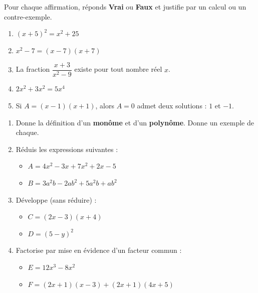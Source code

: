 \documentclass[11pt]{article}
\begin{document}
\begin{exercice}
Pour chaque affirmation, réponds \textbf{Vrai} ou \textbf{Faux} et justifie par un calcul ou un contre-exemple.
\begin{enumerate}
    \item $(x + 5)^2 = x^2 + 25$
    \item $x^2 - 7 = (x - 7)(x + 7)$
    \item La fraction $\dfrac{x + 3}{x^2 - 9}$ existe pour tout nombre réel $x$.
    \item $2x^2 + 3x^2 = 5x^4$
    \item Si $A = (x - 1)(x + 1)$, alors $A = 0$ admet deux solutions : $1$ et $-1$.
\end{enumerate}
\end{exercice}

\begin{exercice}
\begin{enumerate}
    \item Donne la définition d'un \textbf{monôme} et d'un \textbf{polynôme}. Donne un exemple de chaque.
    \item Réduis les expressions suivantes :
    \begin{itemize}
        \item $A = 4x^2 - 3x + 7x^2 + 2x - 5$
        \item $B = 3a^2b - 2ab^2 + 5a^2b + ab^2$
    \end{itemize}
    \item Développe (sans réduire) :
    \begin{itemize}
        \item $C = (2x - 3)(x + 4)$
        \item $D = (5 - y)^2$
    \end{itemize}
    \item Factorise par mise en évidence d'un facteur commun :
    \begin{itemize}
        \item $E = 12x^3 - 8x^2$
        \item $F = (2x + 1)(x - 3) + (2x + 1)(4x + 5)$
    \end{itemize}
\end{enumerate}
\end{exercice}
\end{document}
